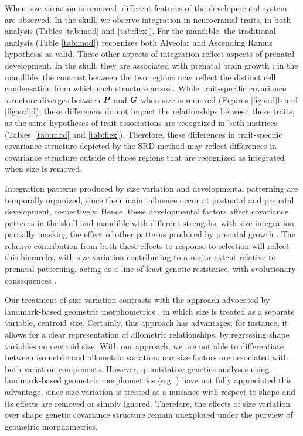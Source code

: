 \documentclass [twocolumn, natbib, nospthms, 10pt] {svjour3}
\begin{document}
When size variation is removed, different features of the
developmental system are observed. In the skull, we observe
integration in neurocranial traits, in both analysis (Tables
\ref{tab:mod} and \ref {tab:flex}). For the mandible, the traditional
analysis (Table \ref{tab:mod}) recognizes both Alveolar and Ascending
Ramus hypothesis as valid. These other aspects of integration reflect
aspects of prenatal development. In the skull, they are associated
with prenatal brain growth \citep{hallgrimsson_mouse_2008,
  hallgrimsson_deciphering_2009}; in the mandible, the contrast
between the two regions may reflect the distinct cell condensation
from which each structure arises \citep{atchley_model_1991,
  ramaesh_growth_2003}. While trait-specific covariance structure
diverges between $\boldsymbol{P}$ and $\boldsymbol{G}$ when size is removed (Figures
\ref{fig:srd}b and \ref{fig:srd}d), these differences do not impact
the relationships between these traits, as the same hypotheses of
trait associations are recognized in both matrices
(Tables~\ref{tab:mod} and \ref{tab:flex}). Therefore, these
differences in trait-specific covariance structure depicted by the SRD
method may reflect differences in covariance structure outside of
those regions that are recognized as integrated when size is removed.

Integration patterns produced by size variation and developmental
patterning are temporally organized, since their main influence occur
at postnatal and prenatal development, respectively. Hence, these
developmental factors affect covariance patterns in the skull and
mandible with different strengths, with size integration partially
masking the effect of other patterns produced by prenatal growth
\citep {hallgrimsson_mouse_2008, hallgrimsson_deciphering_2009}. The
relative contribution from both these effects to response to selection
will reflect this hierarchy, with size variation contributing to a
major extent relative to prenatal patterning, acting as a line of
least genetic resistance, with evolutionary consequences
\citep{schluter_adaptive_1996, marroig_size_2005}.

Our treatment of size variation contrasts with the approach advocated
by landmark-based geometric morphometrics
\citep{bookstein_morphometric_1991, zelditch_geometric_2004}, in which
size is treated as a separate variable, centroid size. Certainly, this
approach has advantages; for instance, it allows for a clear
representation of allometric relationships, by regressing shape
variables on centroid size. With our approach, we are not able to
differentiate between isometric and allometric variation; our size
factors are associated with both variation components. However,
quantitative genetics analyses using landmark-based geometric
morphometrics (e.g. \citealp{klingenberg_quantitative_2001,
  klingenberg_integration_2004, martinez-abadias_pervasive_2011}) have
not fully appreciated this advantage, since size variation is treated
as a nuisance with respect to shape and its effects are removed or
simply ignored. Therefore, the effects of size variation over shape
genetic covariance structure remain unexplored under the purview of
geometric morphometrics.
\end{document}
